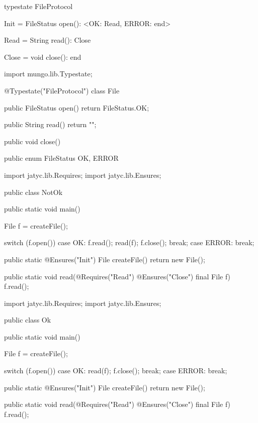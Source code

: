 \begin{code}
typestate FileProtocol {

  Init = {
    FileStatus open(): <OK: Read, ERROR: end>
  }

  Read = {
    String read(): Close
  }

  Close = {
    void close(): end
  }

}\end{code}

\begin{code}
import mungo.lib.Typestate;

@Typestate("FileProtocol")
class File {

  public FileStatus open() {
    return FileStatus.OK;
  }

  public String read() {
    return "";
  }

  public void close() {
  }

}\end{code}

\begin{code}
public enum FileStatus {
  OK, ERROR
}\end{code}

\begin{code}
import jatyc.lib.Requires;
import jatyc.lib.Ensures;

public class NotOk {

  public static void main() {
    File f = createFile();

    switch (f.open()) {
      case OK:
        f.read();
        read(f);
        f.close();
        break;
      case ERROR:
        break;
    }
  }

  public static @Ensures("Init") File createFile() {
    return new File();
  }

  public static void read(@Requires("Read") @Ensures("Close") final File f) {
    f.read();
  }

}\end{code}

\begin{code}
import jatyc.lib.Requires;
import jatyc.lib.Ensures;

public class Ok {

  public static void main() {
    File f = createFile();

    switch (f.open()) {
      case OK:
        read(f);
        f.close();
        break;
      case ERROR:
        break;
    }
  }

  public static @Ensures("Init") File createFile() {
    return new File();
  }

  public static void read(@Requires("Read") @Ensures("Close") final File f) {
    f.read();
  }

}\end{code}

